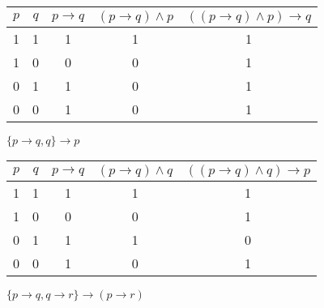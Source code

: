 \documentclass[12pt]{article}
\begin{document}
\begin{tabular}{|c|c|c|c|c|}
	\hline
	\rowcolor{lightblue!50}
	\hline
	$p$ & $q$ & $p\rightarrow q$ & $(p\rightarrow q)\wedge p$ & $\left((p\rightarrow q)\wedge p\right)\rightarrow q$ \\ \hline
	1   & 1   & 1                & 1                          & 1                                                    \\ \hline
	1   & 0   & 0                & 0                          & 1                                                    \\ \hline
	0   & 1   & 1                & 0                          & 1                                                    \\ \hline
	0   & 0   & 1                & 0                          & 1                                                    \\ \hline
\end{tabular}

$\{p\rightarrow q,q\}\rightarrow p$

\begin{tabular}{|c|c|c|c|c|}
	\hline
	\rowcolor{lightblue!50}
	\hline
	$p$ & $q$ & $p\rightarrow q$ & $(p\rightarrow q)\wedge q$ & $\left((p\rightarrow q)\wedge q\right)\rightarrow p$ \\ \hline
	1   & 1   & 1                & 1                          & 1                                                    \\ \hline
	1   & 0   & 0                & 0                          & 1                                                    \\ \hline
	0   & 1   & 1                & 1                          & 0                                                    \\ \hline
	0   & 0   & 1                & 0                          & 1                                                    \\ \hline
\end{tabular}

$\{p\rightarrow q,q\rightarrow r\}\rightarrow (p\rightarrow r)$
\end{document}
